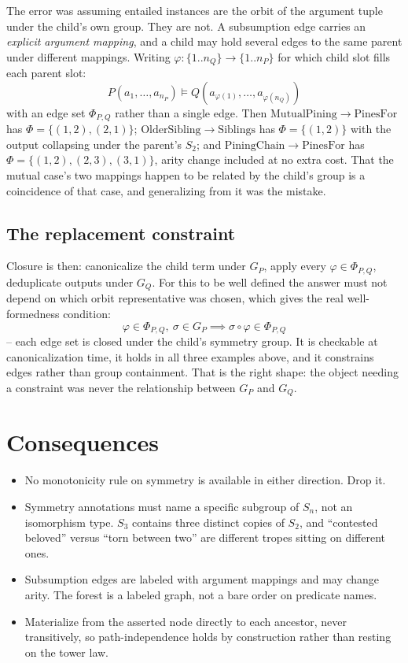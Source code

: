 \documentclass{amsart}
\theoremstyle{remark}
\begin{document}
    The error was assuming entailed instances are the orbit of the argument tuple under the child's own group. They are not. A subsumption edge carries an \emph{explicit argument mapping}, and a child may hold several edges to the same parent under different mappings. Writing $\varphi : \{1..n_Q\} \to \{1..n_P\}$ for which child slot fills each parent slot:
    \[
        P(a_1,\dots,a_{n_P}) \models Q(a_{\varphi(1)},\dots,a_{\varphi(n_Q)})
    \]
    with an edge set $\Phi_{P,Q}$ rather than a single edge. Then $\mathrm{MutualPining} \to \mathrm{PinesFor}$ has $\Phi = \{(1,2),(2,1)\}$; $\mathrm{OlderSibling} \to \mathrm{Siblings}$ has $\Phi = \{(1,2)\}$ with the output collapsing under the parent's $S_2$; and $\mathrm{PiningChain} \to \mathrm{PinesFor}$ has $\Phi = \{(1,2),(2,3),(3,1)\}$, arity change included at no extra cost. That the mutual case's two mappings happen to be related by the child's group is a coincidence of that case, and generalizing from it was the mistake.

    \subsection{The replacement constraint}
    Closure is then: canonicalize the child term under $G_P$, apply every $\varphi \in \Phi_{P,Q}$, deduplicate outputs under $G_Q$. For this to be well defined the answer must not depend on which orbit representative was chosen, which gives the real well-formedness condition:
    \[
        \varphi \in \Phi_{P,Q},\ \sigma \in G_P \implies \sigma \circ \varphi \in \Phi_{P,Q}
    \]
    -- each edge set is closed under the child's symmetry group. It is checkable at canonicalization time, it holds in all three examples above, and it constrains edges rather than group containment. That is the right shape: the object needing a constraint was never the relationship between $G_P$ and $G_Q$.

    \section{Consequences}
    \begin{itemize}
        \item No monotonicity rule on symmetry is available in either direction. Drop it.
        \item Symmetry annotations must name a specific subgroup of $S_n$, not an isomorphism type. $S_3$ contains three distinct copies of $S_2$, and ``contested beloved'' versus ``torn between two'' are different tropes sitting on different ones.
        \item Subsumption edges are labeled with argument mappings and may change arity. The forest is a labeled graph, not a bare order on predicate names.
        \item Materialize from the asserted node directly to each ancestor, never transitively, so path-independence holds by construction rather than resting on the tower law.
    \end{itemize}
\end{document}
